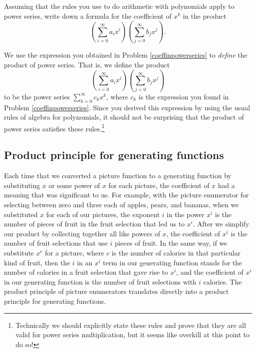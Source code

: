 \iteme Assuming that the rules you use to do arithmetic with polynomials
apply to power series, write down a formula for the coefficient of $x^k$
in the product \label{coeffinpowerseries}
$$\left(\sum_{i=0}^\infty a_ix^i\right)\left(\sum_{j=0}^\infty
b_jx^j\right).$$
\ep

We use the expression you obtained in Problem \ref{coeffinpowerseries} to
{\em define} the product of power series.  That is, we define the product
$$\left(\sum_{i=0}^\infty a_ix^i\right)\left(\sum_{j=0}^\infty
b_jx^j\right)$$ to be the power series $\sum_{k=0}^\infty c_k x^k$, where
$c_k$ is the expression you found in Problem \ref{coeffinpowerseries}.
Since you derived this expression by using the usual rules of algebra for
polynomials, it should not be surprising that the product of power series
satisfies these rules.\footnote{Technically we should explicitly state
these rules and prove that they are all valid for power series
multiplication, but it seems like overkill at this point to do so!}
\subsection{Product principle for generating functions}



 Each time that
we converted a picture function to a generating function by substituting
$x$ or some power of $x$ for each picture, the coefficient of $x$ had a
meaning that was significant to us.  For example, with the
picture enumerator for selecting between zero and three each of apples,
pears, and bananas, when we substituted $x$ for each of our pictures, the
exponent $i$ in the power $x^i$ is the number of pieces of fruit in the
fruit selection that led us to $x^i$.  After we simplify our product by
collecting together all like powers of $x$, the coefficient of $x^i$ is
the number of fruit selections that use $i$ pieces of fruit.  In the same
way, if we substitute $x^c$ for a picture, where $c$ is the number of
calories in that particular kind of fruit, then the $i$ in an $x^i$ term
in our generating function stands for the number of calories in a fruit
selection that gave rise to $x^i$, and the coefficient of $x^i$ in our
generating function is the number of fruit selections with $i$ calories. 
The product principle of picture enumerators translates directly into a
product principle for generating functions.

